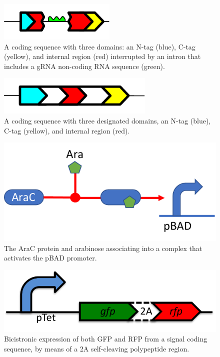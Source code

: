 \begin{figure}[h!]
\includegraphics[scale=1.0]{figures/apdx-examples/apdx-exa20-intron.pdf}
\caption{A coding sequence with three domains: an N-tag (blue), C-tag (yellow), and internal region (red) interrupted by an intron that includes a gRNA non-coding RNA sequence (green).}
\label{f:apdx:exa20}
\end{figure}

\begin{figure}[h!]
\includegraphics[scale=1.0]{figures/apdx-examples/apdx-exa21-polypeptide-region.pdf}
\caption{A coding sequence with three designated domains, an N-tag (blue), C-tag (yellow), and internal region (red).}
\label{f:apdx:exa21}
\end{figure}

\begin{figure}[h!]
\includegraphics[scale=0.75]{figures/apdx-examples/apdx-exa22.pdf}
\caption{The AraC protein and arabinose associating into a complex that activates the pBAD promoter.}
\label{f:apdx:exa22}
\end{figure}

\begin{figure}[h!]
\includegraphics[scale=0.75]{figures/apdx-examples/apdx-exa23-bicistronic.pdf}
\caption{Bicistronic expression of both GFP and RFP from a signal coding sequence, by means of a 2A self-cleaving polypeptide region.}
\label{f:apdx:exa23}
\end{figure}





